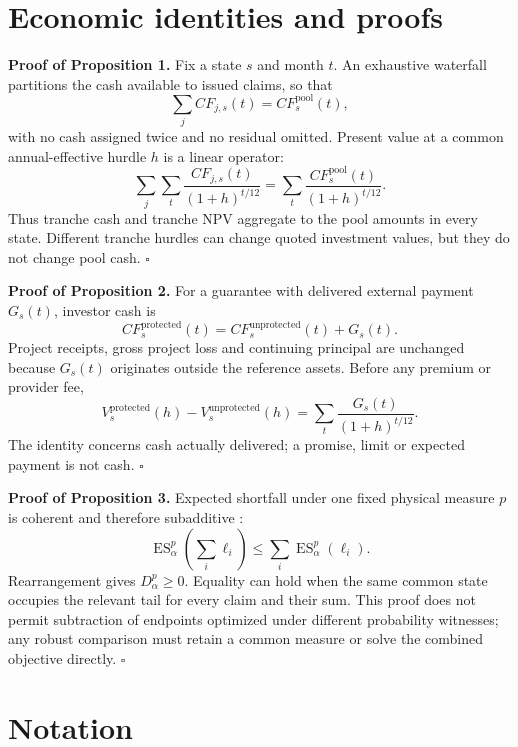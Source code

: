 \documentclass[11pt,a4paper]{article}
\begin{document}

\begingroup
\small

\endgroup

\clearpage
\appendix

\section{Economic identities and proofs}
\label{app:proofs}

\textbf{Proof of Proposition 1.}
Fix a state \(s\) and month \(t\). An exhaustive waterfall partitions the cash available to issued claims, so that
\[
\sum_j CF_{j,s}(t)=CF^{\mathrm{pool}}_s(t),
\]
with no cash assigned twice and no residual omitted. Present value at a common annual-effective hurdle \(h\) is a linear operator:
\[
\sum_j\sum_t\frac{CF_{j,s}(t)}{(1+h)^{t/12}}
=\sum_t\frac{CF^{\mathrm{pool}}_s(t)}{(1+h)^{t/12}}.
\]
Thus tranche cash and tranche NPV aggregate to the pool amounts in every state. Different tranche hurdles can change quoted investment values, but they do not change pool cash. \(\square\)

\textbf{Proof of Proposition 2.}
For a guarantee with delivered external payment \(G_s(t)\), investor cash is
\[
CF^{\mathrm{protected}}_s(t)=CF^{\mathrm{unprotected}}_s(t)+G_s(t).
\]
Project receipts, gross project loss and continuing principal are unchanged because \(G_s(t)\) originates outside the reference assets. Before any premium or provider fee,
\[
V^{\mathrm{protected}}_s(h)-V^{\mathrm{unprotected}}_s(h)
=\sum_t\frac{G_s(t)}{(1+h)^{t/12}}.
\]
The identity concerns cash actually delivered; a promise, limit or expected payment is not cash. \(\square\)

\textbf{Proof of Proposition 3.}
Expected shortfall under one fixed physical measure \(p\) is coherent and therefore subadditive \citep{artzner1999coherent,rockafellar2000cvar}:
\[
\operatorname{ES}^{p}_{\alpha}\!\left(\sum_i\ell_i\right)
\leq\sum_i\operatorname{ES}^{p}_{\alpha}(\ell_i).
\]
Rearrangement gives \(D_\alpha^p\geq0\). Equality can hold when the same common state occupies the relevant tail for every claim and their sum. This proof does not permit subtraction of endpoints optimized under different probability witnesses; any robust comparison must retain a common measure or solve the combined objective directly. \(\square\)

\section{Notation}
\end{document}
